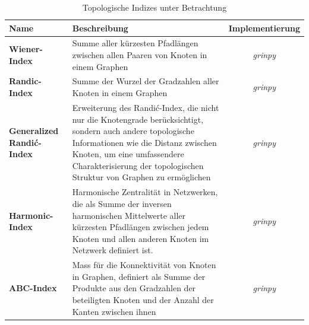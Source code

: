 \begin{table}[H]
    \caption{Topologische Indizes unter Betrachtung}
    \begin{adjustbox}{minipage=\textwidth, center}
        \scriptsize
        \begin{tabularx}{\textwidth}{|l|X|c|}
            \hline
            \textbf{Name}                     & \textbf{Beschreibung}                                                                                                                                                                                                                                    & \textbf{Implementierung} \\
            \hline
            \textbf{Wiener-Index}             & Summe aller kürzesten Pfadlängen zwischen allen Paaren von Knoten in einem Graphen                                                                                                                                                                       & \textit{grinpy}          \\
            \hline
            \textbf{Randic-Index}             & Summe der Wurzel der Gradzahlen aller Knoten in einem Graphen                                                                                                                                                                                            & \textit{grinpy}          \\
            \hline
            \textbf{Generalized Randić-Index} & Erweiterung des Randić-Index, die nicht nur die Knotengrade berücksichtigt, sondern auch andere topologische Informationen wie die Distanz zwischen Knoten, um eine umfassendere Charakterisierung der topologischen Struktur von Graphen zu ermöglichen & \textit{grinpy}          \\
            \hline
            \textbf{Harmonic-Index}           & Harmonische Zentralität in Netzwerken, die als Summe der inversen harmonischen Mittelwerte aller kürzesten Pfadlängen zwischen jedem Knoten und allen anderen Knoten im Netzwerk definiert ist.                                                          & \textit{grinpy}          \\
            \hline
            \textbf{ABC-Index}                & Mass für die Konnektivität von Knoten in Graphen, definiert als Summe der Produkte aus den Gradzahlen der beteiligten Knoten und der Anzahl der Kanten zwischen ihnen                                                                                    & \textit{grinpy}          \\

\end{tabularx}
\end{adjustbox}
\end{table}
